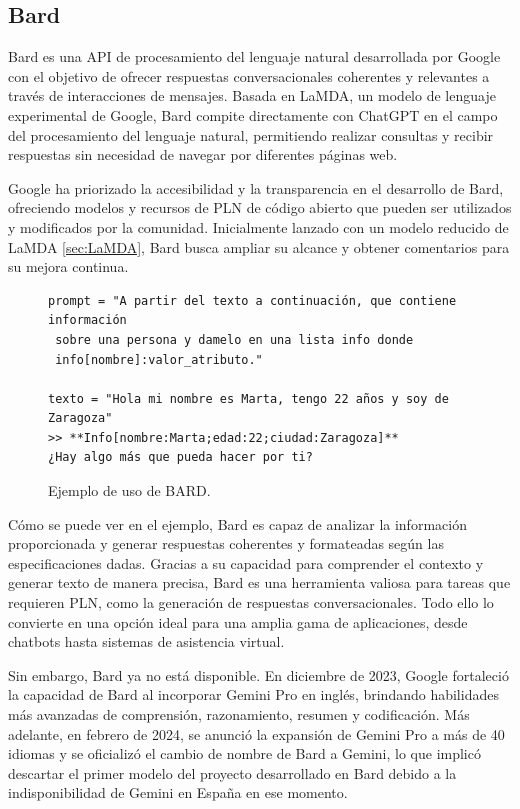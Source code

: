 \subsection{Bard}
Bard es una API de procesamiento del lenguaje natural desarrollada por Google con el objetivo de ofrecer respuestas conversacionales coherentes y relevantes a través de interacciones de mensajes. Basada en LaMDA, un modelo de lenguaje experimental de Google, Bard compite directamente con ChatGPT en el campo del procesamiento del lenguaje natural, permitiendo realizar consultas y recibir respuestas sin necesidad de navegar por diferentes páginas web.

Google ha priorizado la accesibilidad y la transparencia en el desarrollo de Bard, ofreciendo modelos y recursos de PLN de código abierto que pueden ser utilizados y modificados por la comunidad. Inicialmente lanzado con un modelo reducido de LaMDA \ref{sec:LaMDA}, Bard busca ampliar su alcance y obtener comentarios para su mejora continua.

\begin{figure}[h]
	\centering
	\begin{verbatim}
prompt = "A partir del texto a continuación, que contiene información
 sobre una persona y damelo en una lista info donde
 info[nombre]:valor_atributo."

texto = "Hola mi nombre es Marta, tengo 22 años y soy de Zaragoza"
>> **Info[nombre:Marta;edad:22;ciudad:Zaragoza]** 
¿Hay algo más que pueda hacer por ti?
	\end{verbatim}
	\caption{ Ejemplo de uso de BARD.}
	\label{fig:ejemploBARD}
\end{figure}




Cómo se puede ver en el ejemplo, Bard es capaz de analizar la información proporcionada y generar respuestas coherentes y formateadas según las especificaciones dadas. Gracias a su capacidad para comprender el contexto y generar texto de manera precisa, Bard es una herramienta valiosa para tareas que requieren PLN, como la generación de respuestas conversacionales. Todo ello lo convierte en una opción ideal para una amplia gama de aplicaciones, desde chatbots hasta sistemas de asistencia virtual. 

Sin embargo, Bard ya no está disponible. En diciembre de 2023, Google fortaleció la capacidad de Bard al incorporar Gemini Pro en inglés, brindando habilidades más avanzadas de comprensión, razonamiento, resumen y codificación. Más adelante, en febrero de 2024, se anunció la expansión de Gemini Pro a más de 40 idiomas y se oficializó el cambio de nombre de Bard a Gemini, lo que implicó descartar el primer modelo del proyecto desarrollado en Bard debido a la indisponibilidad de Gemini en España en ese momento.


